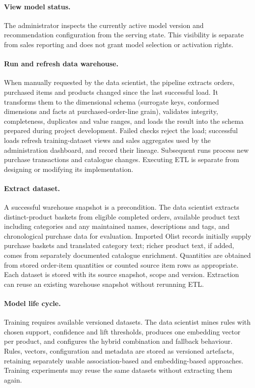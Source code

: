 \documentclass[a4paper,12pt]{article}
\begin{document}
\paragraph{View model status.}
The administrator inspects the currently active model version and recommendation configuration from
the serving state. This visibility is separate from sales reporting and does not grant model
selection or activation rights.

\paragraph{Run and refresh data warehouse.}
When manually requested by the data scientist, the pipeline extracts orders, purchased items and
products changed since the last successful load. It transforms them to the dimensional schema
(surrogate keys, conformed dimensions and facts at purchased-order-line grain), validates integrity,
completeness, duplicates and value ranges, and loads the result into the schema prepared during
project development. Failed checks reject the load; successful loads refresh training-dataset views
and sales aggregates used by the administration dashboard, and record their lineage. Subsequent
runs process new purchase transactions and catalogue changes. Executing ETL is separate from
designing or modifying its implementation.

\paragraph{Extract dataset.}
A successful warehouse snapshot is a precondition. The data scientist extracts distinct-product
baskets from eligible completed orders, available product text including categories and any
maintained names, descriptions and tags, and chronological purchase data for evaluation. Imported
Olist records initially supply purchase baskets and translated category text; richer product text,
if added, comes from separately documented catalogue enrichment. Quantities are obtained from stored
order-item quantities or counted source item rows as appropriate. Each dataset is stored with its
source snapshot, scope and version. Extraction can reuse an existing warehouse snapshot without
rerunning ETL.

\paragraph{Model life cycle.}
Training requires available versioned datasets. The data scientist mines rules with chosen support,
confidence and lift thresholds, produces one embedding vector per product, and configures the hybrid
combination and fallback behaviour. Rules, vectors, configuration and metadata are stored as versioned
artefacts, retaining separately usable association-based and embedding-based approaches. Training
experiments may reuse the same datasets without extracting them again.
\end{document}
